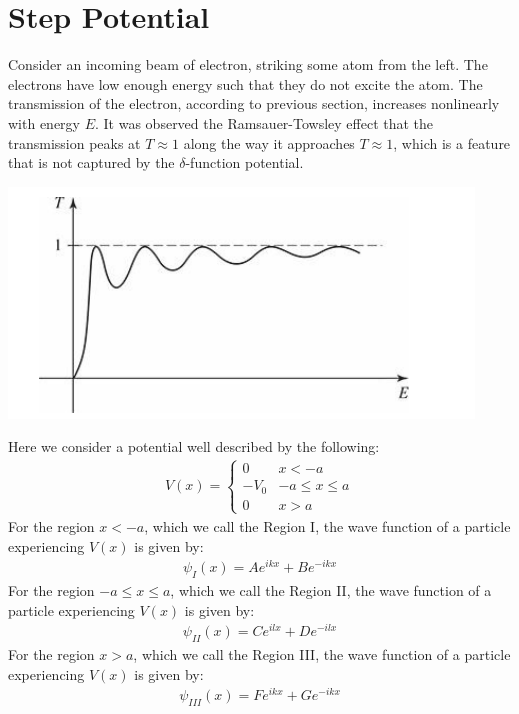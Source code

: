 \documentclass[11pt]{book}
\theoremstyle{break}
\theoremstyle{break}
\begin{document}
\newpage
\section[Step Potential]{\color{red}Step Potential\color{black}}
Consider an incoming beam of electron, striking some atom from the left. The electrons have low enough energy such that they do not excite the atom. The transmission of the electron, according to previous section, increases nonlinearly with energy $E$. It was observed the Ramsauer-Towsley effect that the transmission peaks at $T \approx 1$ along the way it approaches $T \approx 1$, which is a feature that is not captured by the $\delta$-function potential. 
\begin{center}
\includegraphics[scale=0.85]{RTeffect}
\end{center}
Here we consider a potential well described by the following:
\begin{align*}
V(x) = 
\begin{cases} 
0 & x<-a\\
-V_0 & -a\leq x\leq a\\
0 & x>a
\end{cases}
\end{align*} 
For the region $x<-a$, which we call the Region I, the wave function of a particle experiencing $V(x)$ is given by:
\begin{align}
\psi_I(x) = Ae^{ikx} + B e^{-ikx}
\end{align}
For the region $-a\leq x \leq a$, which we call the Region II, the wave function of a particle experiencing $V(x)$ is given by:
\begin{align}
\psi_{II}(x) = Ce^{ilx} + De^{-ilx}
\end{align}
For the region $x>a$, which we call the Region III, the wave function of a particle experiencing $V(x)$ is given by:
\begin{align}
\psi_{III}(x) = Fe^{ikx} + Ge^{-ikx}
\end{align}
\end{document}
